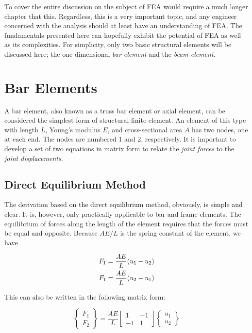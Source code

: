 \documentclass[a4paper,openany,12pt]{book}
\begin{document}
{{To cover the entire discussion on the subject of FEA would require a
much longer chapter that this. Regardless, this is a very important
topic, and any engineer concerned with the analysis should at least have
an understanding of FEA. The fundamentals presented here can hopefully
exhibit the potential of FEA as well as its complexities. For
simplicity, only two basic structural elements will be discussed here;
the one dimensional \emph{bar element} and the \emph{beam element}.

\section{Bar Elements}
\label{bar-elements}
A bar element, also known as a truss bar element or axial element, can
be considered the simplest form of structural finite element. An element
of this type with length \(L\), Young's modulus \(E\), and cross-sectional
area \(A\) has two nodes, one at each end. The nodes are numbered 1 and 2,
respectively. It is important to develop a set of two equations in
matrix form to relate the \emph{joint forces} to the \emph{joint displacements}.

\subsection{Direct Equilibrium Method}
\label{direct-equilibrium-method}
The derivation based on the direct equilibrium method, obviously, is
simple and clear. It is, however, only practically applicable to bar and
frame elements. The equilibrium of forces along the length of the
element requires that the forces must be equal and opposite. Because
\(AE / L\) is the spring constant of the element, we have

$$\begin{gathered}
    F_1 = \frac{AE}{L}(u_1 - u_2) \hfill \\
    F_1 = \frac{AE}{L}(u_2 - u_1) \hfill \\ 
  \end{gathered}$$

This can also be written in the following matrix form:

$$\left\{
    \begin{array}{*{20}{c}}
      F_1 \\ 
      F_2 
    \end{array} \right\} = \frac{AE}{L}\left[
    \begin{array}{*{20}{c}}
      1 & -1 \\ 
     -1 & 1 
   \end{array} \right]\left\{
    \begin{array}{*{20}{c}}
    u_1 \\ 
    u_2 
   \end{array} \right\}$$

}}
\end{document}
